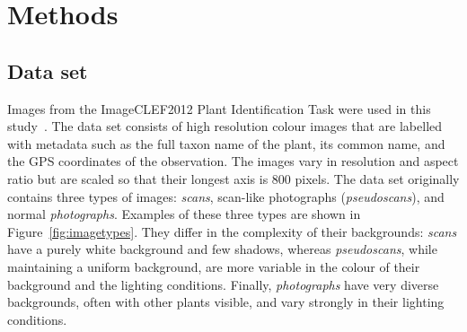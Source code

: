 \section{Methods}


\subsection{Data set}
Images from the ImageCLEF2012 Plant Identification Task were used in this study~\cite{imageclef2012}.
The data set consists of high resolution colour images that are labelled with metadata such as the full taxon name of the plant, its common name, and the GPS coordinates of the observation.
The images vary in resolution and aspect ratio but are scaled so that their longest axis is 800 pixels.
The data set originally contains three types of images: \emph{scans}, scan-like photographs (\emph{pseudoscans}), and normal \emph{photographs}.
Examples of these three types are shown in Figure~\vref{fig:imagetypes}.
They differ in the complexity of their backgrounds: \emph{scans} have a purely white background and few shadows, whereas \emph{pseudoscans}, while maintaining a uniform background, are more variable in the colour of their background and the lighting conditions.
Finally, \emph{photographs} have very diverse backgrounds, often with other plants visible, and vary strongly in their lighting conditions.


